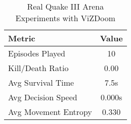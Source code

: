 \begin{table}[h]
\centering
\caption{Real Quake III Arena Experiments with ViZDoom}
\begin{tabular}{|l|c|}
\hline
Metric & Value \\
\hline
Episodes Played & 10 \\
Kill/Death Ratio & 0.00 \\
Avg Survival Time & 7.5s \\
Avg Decision Speed & 0.000s \\
Avg Movement Entropy & 0.330 \\
\hline
\end{tabular}
\end{table}
